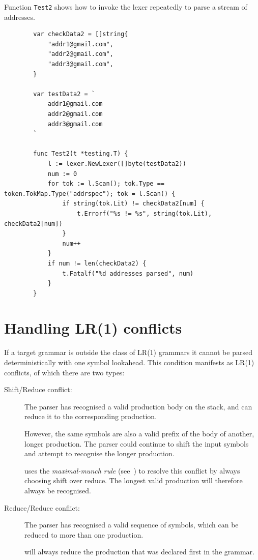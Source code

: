 \documentclass[12pt]{article}
\begin{document}
	Function \verb|Test2| shows how to invoke the lexer repeatedly to parse a stream of addresses.

	\begin{verbatim}
		var checkData2 = []string{
		    "addr1@gmail.com",
		    "addr2@gmail.com",
		    "addr3@gmail.com",
		}

		var testData2 = `
		    addr1@gmail.com
		    addr2@gmail.com
		    addr3@gmail.com
		`

		func Test2(t *testing.T) {
		    l := lexer.NewLexer([]byte(testData2))
		    num := 0
		    for tok := l.Scan(); tok.Type == token.TokMap.Type("addrspec"); tok = l.Scan() {
		        if string(tok.Lit) != checkData2[num] {
		            t.Errorf("%s != %s", string(tok.Lit), checkData2[num])
		        }
		        num++
		    }
		    if num != len(checkData2) {
		        t.Fatalf("%d addresses parsed", num)
		    }
		}
	\end{verbatim}

\section{Handling LR(1) conflicts} \label{sec:lr conflicts}
	If a target grammar is outside the class of LR(1) grammars it cannot be parsed deterministically with one symbol lookahead. This condition manifests as LR(1) conflicts, of which there are two types:

	\begin{description}
		\item[Shift/Reduce conflict:] The parser has recognised a valid production body on the stack, and can reduce it to the corresponding production.

		However, the same symbols are also a valid prefix of the body of another, longer production. The parser could continue to shift the input symbols and attempt to recognise the longer production.

		\gocc uses the {\em maximal-munch rule} (see~\cite{Modern Compiler Design}) to resolve this conflict by always choosing shift over reduce. The longest valid production will therefore always be recognised.

		\item[Reduce/Reduce conflict:] The parser has recognised a valid sequence of symbols, which can be reduced to more than one production.

		\gocc will always reduce the production that was declared first in the grammar.
	\end{description}
\end{document}
